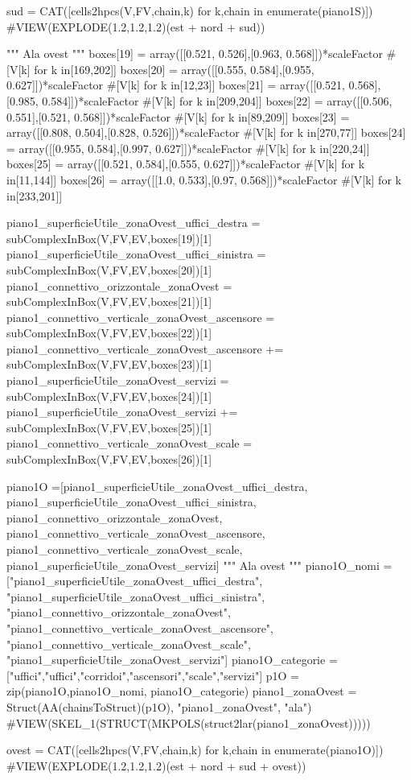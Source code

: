 sud = CAT([cells2hpcs(V,FV,chain,k) for k,chain in enumerate(piano1S)])
#VIEW(EXPLODE(1.2,1.2,1.2)(est + nord + sud))

""" Ala ovest """
boxes[19] = array([[0.521, 0.526],[0.963, 0.568]])*scaleFactor #[V[k] for k in[169,202]]
boxes[20] = array([[0.555, 0.584],[0.955, 0.627]])*scaleFactor #[V[k] for k in[12,23]]
boxes[21] = array([[0.521, 0.568],[0.985, 0.584]])*scaleFactor #[V[k] for k in[209,204]]
boxes[22] = array([[0.506, 0.551],[0.521, 0.568]])*scaleFactor #[V[k] for k in[89,209]]
boxes[23] = array([[0.808, 0.504],[0.828, 0.526]])*scaleFactor #[V[k] for k in[270,77]]
boxes[24] = array([[0.955, 0.584],[0.997, 0.627]])*scaleFactor #[V[k] for k in[220,24]]
boxes[25] = array([[0.521, 0.584],[0.555, 0.627]])*scaleFactor #[V[k] for k in[11,144]]
boxes[26] = array([[1.0, 0.533],[0.97, 0.568]])*scaleFactor #[V[k] for k in[233,201]]

piano1_superficieUtile_zonaOvest_uffici_destra = subComplexInBox(V,FV,EV,boxes[19])[1]
piano1_superficieUtile_zonaOvest_uffici_sinistra = subComplexInBox(V,FV,EV,boxes[20])[1]
piano1_connettivo_orizzontale_zonaOvest = subComplexInBox(V,FV,EV,boxes[21])[1]
piano1_connettivo_verticale_zonaOvest_ascensore = subComplexInBox(V,FV,EV,boxes[22])[1]
piano1_connettivo_verticale_zonaOvest_ascensore += subComplexInBox(V,FV,EV,boxes[23])[1]
piano1_superficieUtile_zonaOvest_servizi = subComplexInBox(V,FV,EV,boxes[24])[1]
piano1_superficieUtile_zonaOvest_servizi += subComplexInBox(V,FV,EV,boxes[25])[1]
piano1_connettivo_verticale_zonaOvest_scale = subComplexInBox(V,FV,EV,boxes[26])[1]

piano1O =[piano1_superficieUtile_zonaOvest_uffici_destra, piano1_superficieUtile_zonaOvest_uffici_sinistra, piano1_connettivo_orizzontale_zonaOvest, piano1_connettivo_verticale_zonaOvest_ascensore, piano1_connettivo_verticale_zonaOvest_scale, piano1_superficieUtile_zonaOvest_servizi]
""" Ala ovest """
piano1O_nomi =["piano1_superficieUtile_zonaOvest_uffici_destra", "piano1_superficieUtile_zonaOvest_uffici_sinistra", "piano1_connettivo_orizzontale_zonaOvest", "piano1_connettivo_verticale_zonaOvest_ascensore", "piano1_connettivo_verticale_zonaOvest_scale", "piano1_superficieUtile_zonaOvest_servizi"]
piano1O_categorie =["uffici","uffici","corridoi","ascensori","scale","servizi"]
p1O = zip(piano1O,piano1O_nomi, piano1O_categorie)
piano1_zonaOvest = Struct(AA(chainsToStruct)(p1O), "piano1_zonaOvest", "ala")
#VIEW(SKEL_1(STRUCT(MKPOLS(struct2lar(piano1_zonaOvest)))))
    
ovest = CAT([cells2hpcs(V,FV,chain,k) for k,chain in enumerate(piano1O)])
#VIEW(EXPLODE(1.2,1.2,1.2)(est + nord + sud + ovest))

